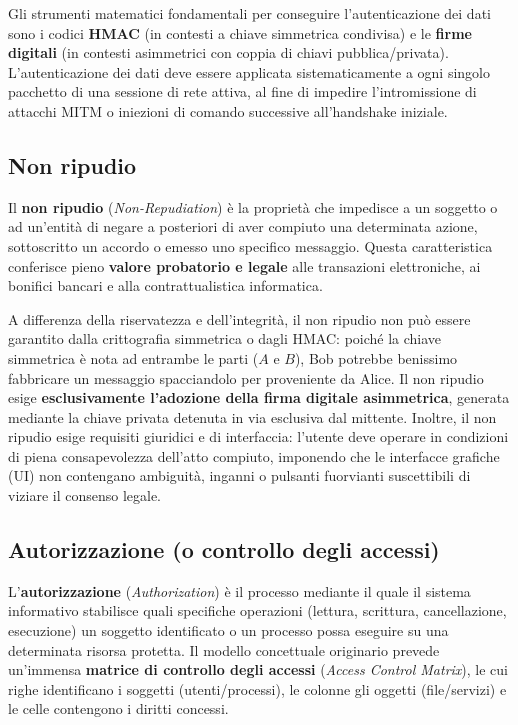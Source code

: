 \documentclass[../../main.tex]{subfiles}
\begin{document}
Gli strumenti matematici fondamentali per conseguire l'autenticazione dei dati sono i codici \textbf{HMAC} (in contesti a chiave simmetrica condivisa) e le \textbf{firme digitali} (in contesti asimmetrici con coppia di chiavi pubblica/privata). L'autenticazione dei dati deve essere applicata sistematicamente a ogni singolo pacchetto di una sessione di rete attiva, al fine di impedire l'intromissione di attacchi MITM o iniezioni di comando successive all'handshake iniziale.

\subsection{Non ripudio}
\label{subsec:non_ripudio}

Il \textbf{non ripudio} (\textit{Non-Repudiation}) è la proprietà che impedisce a un soggetto o ad un'entità di negare a posteriori di aver compiuto una determinata azione, sottoscritto un accordo o emesso uno specifico messaggio. Questa caratteristica conferisce pieno \textbf{valore probatorio e legale} alle transazioni elettroniche, ai bonifici bancari e alla contrattualistica informatica.

A differenza della riservatezza e dell'integrità, il non ripudio non può essere garantito dalla crittografia simmetrica o dagli HMAC: poiché la chiave simmetrica è nota ad entrambe le parti ($A$ e $B$), Bob potrebbe benissimo fabbricare un messaggio spacciandolo per proveniente da Alice. Il non ripudio esige \textbf{esclusivamente l'adozione della firma digitale asimmetrica}, generata mediante la chiave privata detenuta in via esclusiva dal mittente. Inoltre, il non ripudio esige requisiti giuridici e di interfaccia: l'utente deve operare in condizioni di piena consapevolezza dell'atto compiuto, imponendo che le interfacce grafiche (UI) non contengano ambiguità, inganni o pulsanti fuorvianti suscettibili di viziare il consenso legale.

\subsection{Autorizzazione (o controllo degli accessi)}
\label{subsec:autorizzazione}

L'\textbf{autorizzazione} (\textit{Authorization}) è il processo mediante il quale il sistema informativo stabilisce quali specifiche operazioni (lettura, scrittura, cancellazione, esecuzione) un soggetto identificato o un processo possa eseguire su una determinata risorsa protetta. Il modello concettuale originario prevede un'immensa \textbf{matrice di controllo degli accessi} (\textit{Access Control Matrix}), le cui righe identificano i soggetti (utenti/processi), le colonne gli oggetti (file/servizi) e le celle contengono i diritti concessi.
\end{document}
